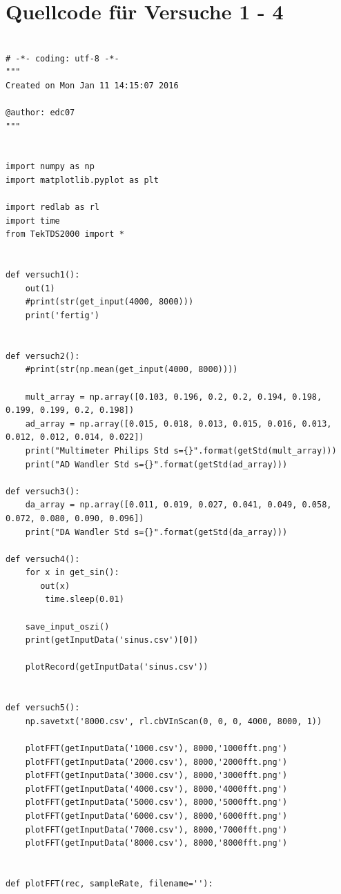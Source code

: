 \documentclass[12pt,oneside,a4paper]{report}
\begin{document}
\section{Quellcode für Versuche 1 - 4}
\label{chap:APPENDIX_SOURCECODE}
\begin{lstlisting}[style=PYTHON, frame=single, caption=QuellCodeV1 bis V4, captionpos=b, label=lst:Code]

# -*- coding: utf-8 -*-
"""
Created on Mon Jan 11 14:15:07 2016

@author: edc07
"""


import numpy as np
import matplotlib.pyplot as plt

import redlab as rl
import time
from TekTDS2000 import *


def versuch1():
    out(1)
    #print(str(get_input(4000, 8000)))
    print('fertig')


def versuch2():
    #print(str(np.mean(get_input(4000, 8000))))

    mult_array = np.array([0.103, 0.196, 0.2, 0.2, 0.194, 0.198, 0.199, 0.199, 0.2, 0.198])
    ad_array = np.array([0.015, 0.018, 0.013, 0.015, 0.016, 0.013, 0.012, 0.012, 0.014, 0.022])
    print("Multimeter Philips Std s={}".format(getStd(mult_array)))
    print("AD Wandler Std s={}".format(getStd(ad_array)))

def versuch3():
    da_array = np.array([0.011, 0.019, 0.027, 0.041, 0.049, 0.058, 0.072, 0.080, 0.090, 0.096])
    print("DA Wandler Std s={}".format(getStd(da_array)))

def versuch4():    
    for x in get_sin():
       out(x)
        time.sleep(0.01)
    
    save_input_oszi()
    print(getInputData('sinus.csv')[0])
    
    plotRecord(getInputData('sinus.csv'))


def versuch5():
    np.savetxt('8000.csv', rl.cbVInScan(0, 0, 0, 4000, 8000, 1))
    
    plotFFT(getInputData('1000.csv'), 8000,'1000fft.png')
    plotFFT(getInputData('2000.csv'), 8000,'2000fft.png')
    plotFFT(getInputData('3000.csv'), 8000,'3000fft.png')
    plotFFT(getInputData('4000.csv'), 8000,'4000fft.png')
    plotFFT(getInputData('5000.csv'), 8000,'5000fft.png')
    plotFFT(getInputData('6000.csv'), 8000,'6000fft.png')
    plotFFT(getInputData('7000.csv'), 8000,'7000fft.png')
    plotFFT(getInputData('8000.csv'), 8000,'8000fft.png')


def plotFFT(rec, sampleRate, filename=''):
    

\end{lstlisting}
\end{document}
